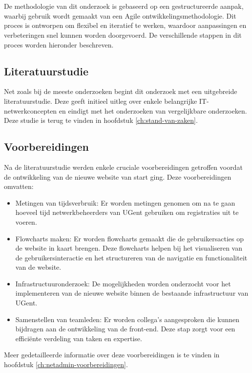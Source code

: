
\chapter{}%
\label{ch:methodologie}

De methodologie van dit onderzoek is gebaseerd op een gestructureerde aanpak, waarbij gebruik wordt gemaakt van een Agile ontwikkelingsmethodologie. Dit proces is ontworpen om flexibel en iteratief te werken, waardoor aanpassingen en verbeteringen snel kunnen worden doorgevoerd. De verschillende stappen in dit proces worden hieronder beschreven.

\section{Literatuurstudie}
Net zoals bij de meeste onderzoeken begint dit onderzoek met een uitgebreide literatuurstudie. Deze geeft initieel uitleg over enkele belangrijke IT-netwerkconcepten en eindigt met het onderzoeken van vergelijkbare onderzoeken. Deze studie is terug te vinden in hoofdstuk \ref{ch:stand-van-zaken}.

\section{Voorbereidingen}
Na de literatuurstudie werden enkele cruciale voorbereidingen getroffen voordat de ontwikkeling van de nieuwe website van start ging. Deze voorbereidingen omvatten:
\begin{itemize}
    \item Metingen van tijdsverbruik: Er worden metingen genomen om na te gaan hoeveel tijd netwerkbeheerders van UGent gebruiken om registraties uit te voeren.
    \item Flowcharts maken: Er worden flowcharts gemaakt die de gebruikersacties op de website in kaart brengen. Deze flowcharts helpen bij het visualiseren van de gebruikersinteractie en het structureren van de navigatie en functionaliteit van de website.
    \item Infrastructuuronderzoek: De mogelijkheden worden onderzocht voor het implementeren van de nieuwe website binnen de bestaande infrastructuur van UGent.
    \item Samenstellen van teamleden: Er worden collega's aangesproken die kunnen bijdragen aan de ontwikkeling van de front-end. Deze stap zorgt voor een efficiënte verdeling van taken en expertise.
\end{itemize}
Meer gedetailleerde informatie over deze voorbereidingen is te vinden in hoofdstuk \ref{ch:netadmin-voorbereidingen}.

